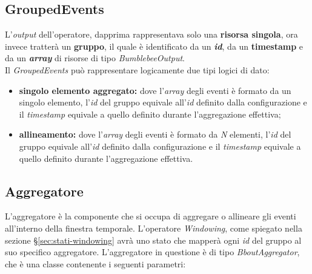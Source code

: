 \subsection{GroupedEvents}\label{sec:ge}
L'\textit{output} dell'operatore, dapprima rappresentava solo una \textbf{risorsa singola}, ora invece tratterà un \textbf{gruppo}, il quale è identificato da un \textbf{\textit{id}}, da un \textbf{\gls{timestamp}} e da un \textbf{\textit{array}} di risorse di tipo \textit{BumblebeeOutput}.\\
Il \textit{GroupedEvents} può rappresentare logicamente due tipi logici di dato:
\begin{itemize}
	\item{\textbf{singolo elemento aggregato:} dove l'\textit{array} degli eventi è formato da un singolo elemento, l'\textit{id} del gruppo equivale all'\textit{id} definito dalla configurazione e il \textit{\gls{timestamp}} equivale a quello definito durante l'aggregazione effettiva;}
	\item{\textbf{allineamento:} dove l'\textit{array} degli eventi è formato da \textit{N} elementi, l'\textit{id} del gruppo equivale all'\textit{id} definito dalla configurazione e il \textit{\gls{timestamp}} equivale a quello definito durante l'aggregazione effettiva.}
\end{itemize}

\subsection{Aggregatore}\label{sec:aggregator}
L'aggregatore è la componente che si occupa di aggregare o allineare gli eventi all'interno della finestra temporale. L'operatore \textit{Windowing}, come spiegato nella sezione \S\ref{sec:stati-windowing} avrà uno stato che mapperà ogni \textit{id} del gruppo al suo specifico aggregatore. L'aggregatore in questione è di tipo \textit{BboutAggregator}, che è una classe contenente i seguenti parametri:

